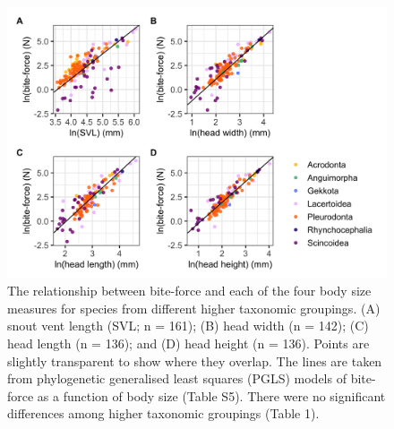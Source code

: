 \documentclass[a4paper, 12pt]{article}
\begin{document}
\newpage
\begin{figure}[h]
 \centering
  \includegraphics[width = \linewidth]{figures/bodysize-bite-force-coloured.png}
  \caption{The relationship between bite-force and each of the four body size measures for species from different higher taxonomic groupings. 
  (A) snout vent length (SVL; n = 161); (B) head width (n = 142); (C) head length (n = 136); and (D) head height (n = 136). 
  Points are slightly transparent to show where they overlap. 
  The lines are taken from phylogenetic generalised least squares (PGLS) models of bite-force as a function of body size (Table S5). 
  There were no significant differences among higher taxonomic groupings (Table 1). 
  }
  \label{fig-size-biteforce}
\end{figure}
\end{document}
